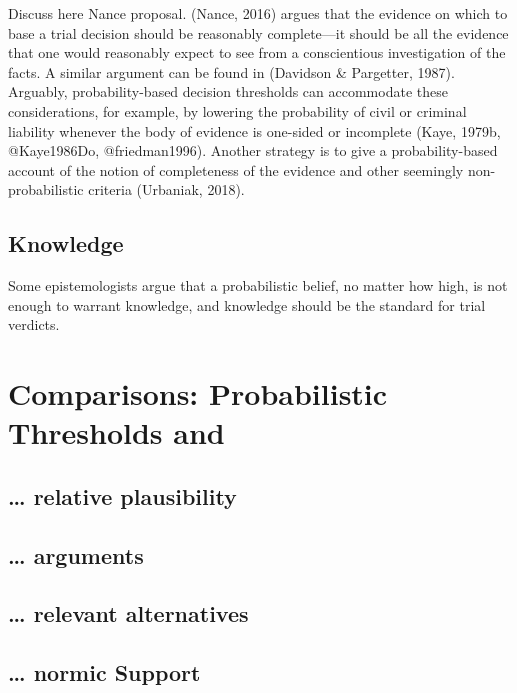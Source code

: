 \documentclass[10pt,dvipsnames]{scrartcl}
\begin{document}
Discuss here Nance proposal. (Nance, 2016) argues that the evidence on
which to base a trial decision should be reasonably complete---it should
be all the evidence that one would reasonably expect to see from a
conscientious investigation of the facts. A similar argument can be
found in (Davidson \& Pargetter, 1987). Arguably, probability-based
decision thresholds can accommodate these considerations, for example,
by lowering the probability of civil or criminal liability whenever the
body of evidence is one-sided or incomplete (Kaye, 1979b, @Kaye1986Do,
@friedman1996). Another strategy is to give a probability-based account
of the notion of completeness of the evidence and other seemingly
non-probabilistic criteria (Urbaniak, 2018).

\hypertarget{knowledge}{%
\subsection{Knowledge}\label{knowledge}}

Some epistemologists argue that a probabilistic belief, no matter how
high, is not enough to warrant knowledge, and knowledge should be the
standard for trial verdicts.

\hypertarget{comparisons-probabilistic-thresholds-and}{%
\section{Comparisons: Probabilistic Thresholds
and}\label{comparisons-probabilistic-thresholds-and}}

\hypertarget{relative-plausibility-1}{%
\subsection{\ldots{} relative
plausibility}\label{relative-plausibility-1}}

\hypertarget{arguments-1}{%
\subsection{\ldots{} arguments}\label{arguments-1}}

\hypertarget{relevant-alternatives-1}{%
\subsection{\ldots{} relevant
alternatives}\label{relevant-alternatives-1}}

\hypertarget{normic-support-1}{%
\subsection{\ldots{} normic Support}\label{normic-support-1}}
\end{document}

